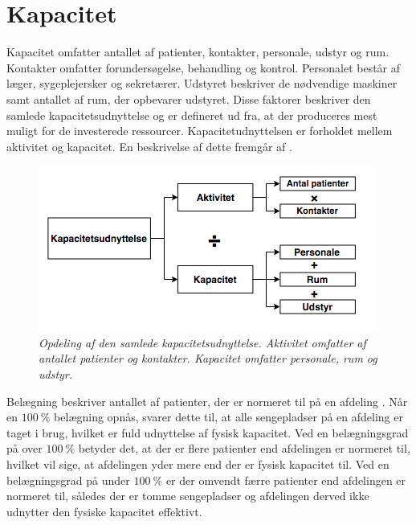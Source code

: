 \section{Kapacitet} \label{kap}
Kapacitet omfatter antallet af patienter, kontakter, personale, udstyr og rum. Kontakter omfatter forundersøgelse, behandling og kontrol. Personalet består af læger, sygeplejersker og sekretærer. Udstyret beskriver de nødvendige maskiner samt antallet af rum, der opbevarer udstyret. Disse faktorer beskriver den samlede kapacitetsudnyttelse og er defineret ud fra, at der produceres mest muligt for de investerede ressourcer. Kapacitetudnyttelsen er forholdet mellem aktivitet og kapacitet. \cite{Company2013} En beskrivelse af dette fremgår af .  

\begin{figure}[H]
	\flushleft 
	\centering
	\includegraphics[scale=.45]{figures/Kapacitetsudnyttelse.png}
	\flushleft
	\caption{\textit{Opdeling af den samlede kapacitetsudnyttelse. Aktivitet omfatter af antallet patienter og kontakter. Kapacitet omfatter personale, rum og udstyr. \cite{Company2013}}}
	\label{kapacitet}
\end{figure}

\noindent
Belægning beskriver antallet af patienter, der er normeret til på en afdeling \cite{Heidmann2014}. Når en $100~\%$ belægning opnås, svarer dette til, at alle sengepladser på en afdeling er taget i brug, hvilket er fuld udnyttelse af fysisk kapacitet. Ved en belægningsgrad på over $100~\%$ betyder det, at der er flere patienter end afdelingen er normeret til, hvilket vil sige, at afdelingen yder mere end der er fysisk kapacitet til. Ved en belægningsgrad på under $100~\%$ er der omvendt færre patienter end afdelingen er normeret til, således der er tomme sengepladser og afdelingen derved ikke udnytter den fysiske kapacitet effektivt. \cite{Pauly1986} 

